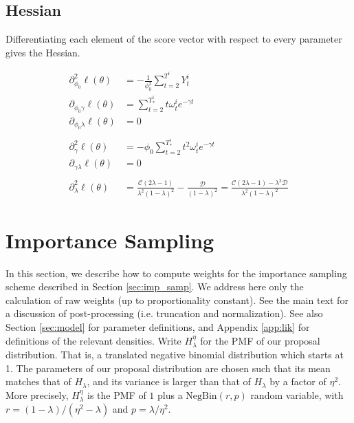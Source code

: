 \documentclass[11pt, oneside]{article}   	%
\begin{document}
\begin{appendices}
	\subsection{Hessian}

	Differentiating each element of the score vector with respect to every parameter gives the Hessian.

	\begin{align}
		\partial^2_{\phi_0} \ell(\theta) &= - \frac{1}{\phi_0^2}\sum_{t=2}^{T^i} Y^i_t\\
		\partial_{\phi_0 \gamma} \ell(\theta) &= \sum_{t=2}^{T_*^i} t \omega^i_t e^{-\gamma t}\\
		\partial_{\phi_0 \lambda} \ell(\theta) &= 0\\ \nonumber\\
		\partial^2_{\gamma} \ell(\theta) &= - \phi_0 \sum_{t=2}^{T_*^i} t^2 \omega^i_t e^{-\gamma t}\\
		\partial_{\gamma \lambda} \ell(\theta) &= 0\\ \nonumber \\
		\partial^2_{\lambda} \ell(\theta) &= \frac{\mathcal{C} (2 \lambda - 1)}{\lambda^2 (1-\lambda)^2} - \frac{\mathscr{D}}{(1-\lambda)^2} = \frac{\mathcal{C} (2 \lambda - 1) - \lambda^2 \mathscr{D}}{\lambda^2 (1-\lambda)^2}
	\end{align}





	\section{Importance Sampling}
	\label{app:imp_samp}

	In this section, we describe how to compute weights for the importance sampling scheme described in Section \ref{sec:imp_samp}. We address here only the calculation of raw weights (up to proportionality constant). See the main text for a discussion of post-processing (i.e. truncation and normalization). See also Section \ref{sec:model} for parameter definitions, and Appendix \ref{app:lik} for definitions of the relevant densities. Write $H_\lambda^\eta$ for the PMF of our proposal distribution. That is, a translated negative binomial distribution which starts at 1. The parameters of our proposal distribution are chosen such that its mean matches that of $H_\lambda$, and its variance is larger than that of $H_\lambda$ by a factor of $\eta^2$. More precisely, $H_\lambda^\eta$ is the PMF of $1$ plus a $\mathrm{NegBin}(r, p)$ random variable, with $r = (1 - \lambda) / (\eta^2 - \lambda)$ and $p = \lambda / \eta^2$.


\end{appendices}
\end{document}
